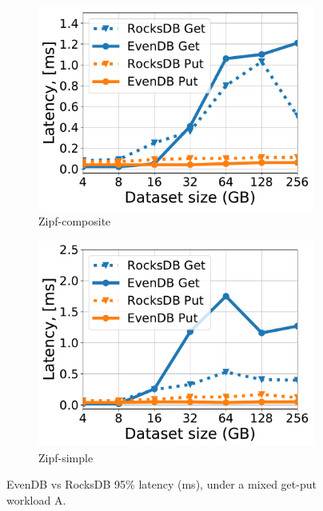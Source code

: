 \documentclass[sigplan,10pt]{acmart}
\newcommand{\sys}{EvenDB}
\begin{document}
\begin{figure}[htb]
\centering
\begin{subfigure}{0.49\linewidth}
\includegraphics[width=\textwidth]{figs/tail_flurry_line.pdf}
\caption{Zipf-composite}
\label{fig:tail_latency:co}
\end{subfigure}
\begin{subfigure}{0.49\linewidth}
\includegraphics[width=\textwidth]{figs/tail_zipf_line.pdf}
\caption{Zipf-simple}
\label{fig:tail_latency:si}
\end{subfigure}
\caption{{\sys\/ vs RocksDB 95\% latency (ms), under a mixed get-put workload A.}}
\label{fig:tail_latency}
\end{figure}
\end{document}
